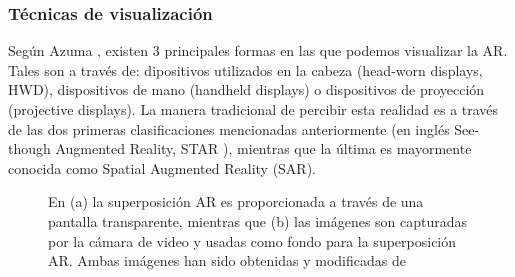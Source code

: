 \documentclass[a4paper,openright,12pt]{report}
\begin{document}
\subsubsection{Técnicas de visualización}
Según Azuma \citep{azuma2001}, existen 3 principales formas en las que podemos visualizar la AR. Tales son a través de: dipositivos utilizados en la cabeza (head-worn displays, HWD), dispositivos de mano (handheld displays) o dispositivos de proyección (projective displays). La manera tradicional de percibir esta realidad es a través de las dos primeras clasificaciones mencionadas anteriormente (en inglés See-though Augmented Reality, STAR \citep{Sol2016}), mientras que la última es mayormente conocida como Spatial Augmented Reality (SAR).\\
\begin{figure}[thbp]
	\centering
	\caption[Funcionamiento de los HMD's]{En (a) la superposición AR es proporcionada a través de una pantalla transparente, mientras que (b) las imágenes son capturadas por la cámara de video y usadas como fondo para la superposición AR. Ambas imágenes han sido obtenidas y modificadas de \citep{azuma1997} } \label{fig:opticalvideo}
\end{figure}
\end{document}
